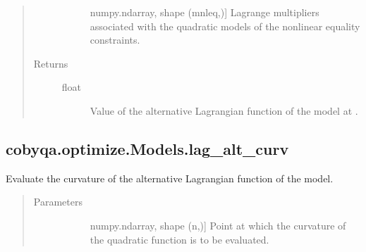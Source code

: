 \documentclass[letterpaper,10pt,english]{sphinxmanual}
\begin{document}
\begin{fulllineitems}
\begin{fulllineitems}
\begin{quote}
\begin{description}
\begin{description}
\item[{}] \leavevmode{[}numpy.ndarray, shape (mnleq,){]}
\sphinxAtStartPar
Lagrange multipliers associated with the quadratic models of the
nonlinear equality constraints.

\end{description}

\item[{Returns}] \leavevmode\begin{description}
\item[{float}] \leavevmode
\sphinxAtStartPar
Value of the alternative Lagrangian function of the model at .

\end{description}

\end{description}\end{quote}

\end{fulllineitems}



\subsection{cobyqa.optimize.Models.lag\_alt\_curv}
\label{\detokenize{refs/generated/cobyqa.optimize.Models.lag_alt_curv:cobyqa-optimize-models-lag-alt-curv}}\label{\detokenize{refs/generated/cobyqa.optimize.Models.lag_alt_curv::doc}}

\begin{fulllineitems}
\label{\detokenize{refs/generated/cobyqa.optimize.Models.lag_alt_curv:cobyqa.optimize.Models.lag_alt_curv}}
\sphinxAtStartPar
Evaluate the curvature of the alternative Lagrangian function of the
model.
\begin{quote}\begin{description}
\item[{Parameters}] \leavevmode\begin{description}
\item[{}] \leavevmode{[}numpy.ndarray, shape (n,){]}
\sphinxAtStartPar
Point at which the curvature of the quadratic function is to be
evaluated.


\end{description}
\end{description}
\end{quote}
\end{fulllineitems}
\end{fulllineitems}
\end{document}
